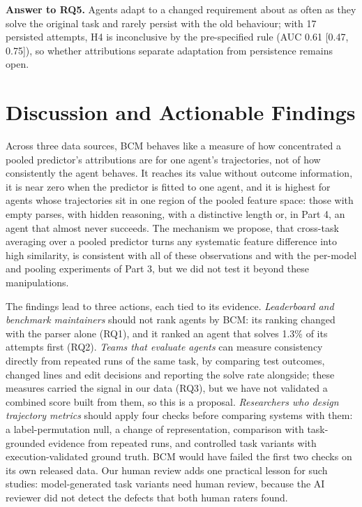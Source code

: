 \documentclass[conference]{IEEEtran}
\newcommand{\bcm}{\textsc{BCM}}
\begin{document}
\textbf{Answer to RQ5.} Agents adapt to a changed requirement about as often as they solve the original task and rarely persist with the old behaviour; with 17 persisted attempts, H4 is inconclusive by the pre-specified rule (AUC 0.61 [0.47, 0.75]), so whether attributions separate adaptation from persistence remains open.

\section{Discussion and Actionable Findings}
\label{sec:discussion}
Across three data sources, \bcm{} behaves like a measure of how concentrated a pooled predictor's attributions are for one agent's trajectories, not of how consistently the agent behaves. It reaches its value without outcome information, it is near zero when the predictor is fitted to one agent, and it is highest for agents whose trajectories sit in one region of the pooled feature space: those with empty parses, with hidden reasoning, with a distinctive length or, in Part 4, an agent that almost never succeeds. The mechanism we propose, that cross-task averaging over a pooled predictor turns any systematic feature difference into high similarity, is consistent with all of these observations and with the per-model and pooling experiments of Part 3, but we did not test it beyond these manipulations.

The findings lead to three actions, each tied to its evidence. \emph{Leaderboard and benchmark maintainers} should not rank agents by \bcm: its ranking changed with the parser alone (RQ1), and it ranked an agent that solves 1.3\% of its attempts first (RQ2). \emph{Teams that evaluate agents} can measure consistency directly from repeated runs of the same task, by comparing test outcomes, changed lines and edit decisions and reporting the solve rate alongside; these measures carried the signal in our data (RQ3), but we have not validated a combined score built from them, so this is a proposal. \emph{Researchers who design trajectory metrics} should apply four checks before comparing systems with them: a label-permutation null, a change of representation, comparison with task-grounded evidence from repeated runs, and controlled task variants with execution-validated ground truth. \bcm{} would have failed the first two checks on its own released data. Our human review adds one practical lesson for such studies: model-generated task variants need human review, because the AI reviewer did not detect the defects that both human raters found.
\end{document}
